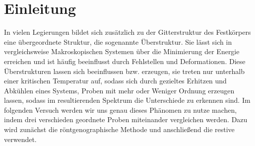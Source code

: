 \section{Einleitung}
    In vielen Legierungen bildet sich zusätzlich zu der Gitterstruktur des Festkörpers eine übergeordnete
    Struktur, die sogenannte Überstruktur. Sie lässt sich in vergleichsweise Makroskopischen Systemen
    über die Minimierung der Energie erreichen und ist häufig beeinflusst durch Fehlstellen und Deformationen.
    Diese Überstrukturen lassen sich beeinflussen bzw. erzeugen, sie treten nur unterhalb einer kritischen
    Temperatur auf, sodass sich durch gezieltes Erhitzen und Abkühlen eines Systems, Proben mit mehr
    oder Weniger Ordnung erzeugen lassen, sodass im resultierenden Spektrum die Unterschiede zu erkennen sind.
    Im folgenden Versuch werden wir uns genau dieses Phänomen zu nutze machen, indem drei verschieden geordnete
    Proben miteinander vergleichen werden. Dazu wird zunächst die röntgenographische Methode und anschließend
    die restive verwendet.